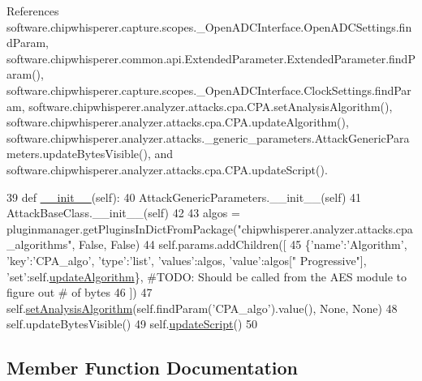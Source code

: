 References software.\+chipwhisperer.\+capture.\+scopes.\+\_\+\+Open\+A\+D\+C\+Interface.\+Open\+A\+D\+C\+Settings.\+find\+Param, software.\+chipwhisperer.\+common.\+api.\+Extended\+Parameter.\+Extended\+Parameter.\+find\+Param(), software.\+chipwhisperer.\+capture.\+scopes.\+\_\+\+Open\+A\+D\+C\+Interface.\+Clock\+Settings.\+find\+Param, software.\+chipwhisperer.\+analyzer.\+attacks.\+cpa.\+C\+P\+A.\+set\+Analysis\+Algorithm(), software.\+chipwhisperer.\+analyzer.\+attacks.\+cpa.\+C\+P\+A.\+update\+Algorithm(), software.\+chipwhisperer.\+analyzer.\+attacks.\+\_\+generic\+\_\+parameters.\+Attack\+Generic\+Parameters.\+update\+Bytes\+Visible(), and software.\+chipwhisperer.\+analyzer.\+attacks.\+cpa.\+C\+P\+A.\+update\+Script().


\begin{DoxyCode}
39     \textcolor{keyword}{def }\hyperlink{classsoftware_1_1chipwhisperer_1_1analyzer_1_1attacks_1_1cpa_1_1CPA_ae83c4d5f16963fe1c3aedde9085e972e}{\_\_init\_\_}(self):
40         AttackGenericParameters.\_\_init\_\_(self)
41         AttackBaseClass.\_\_init\_\_(self)
42 
43         algos = pluginmanager.getPluginsInDictFromPackage(\textcolor{stringliteral}{"chipwhisperer.analyzer.attacks.cpa\_algorithms"}, \textcolor{keyword}{
      False}, \textcolor{keyword}{False})
44         self.params.addChildren([
45             \{\textcolor{stringliteral}{'name'}:\textcolor{stringliteral}{'Algorithm'}, \textcolor{stringliteral}{'key'}:\textcolor{stringliteral}{'CPA\_algo'}, \textcolor{stringliteral}{'type'}:\textcolor{stringliteral}{'list'}, \textcolor{stringliteral}{'values'}:algos, \textcolor{stringliteral}{'value'}:algos[\textcolor{stringliteral}{"
      Progressive"}], \textcolor{stringliteral}{'set'}:self.\hyperlink{classsoftware_1_1chipwhisperer_1_1analyzer_1_1attacks_1_1cpa_1_1CPA_a16178f7a5d24e45eb6e05bdb9255fb25}{updateAlgorithm}\},            \textcolor{comment}{#TODO: Should be called from the AES module to
       figure out # of bytes}
46         ])
47         self.\hyperlink{classsoftware_1_1chipwhisperer_1_1analyzer_1_1attacks_1_1cpa_1_1CPA_a3f35e71a6b226c8c5b4ba08457df7a61}{setAnalysisAlgorithm}(self.findParam(\textcolor{stringliteral}{'CPA\_algo'}).value(), \textcolor{keywordtype}{None}, \textcolor{keywordtype}{None})
48         self.updateBytesVisible()
49         self.\hyperlink{classsoftware_1_1chipwhisperer_1_1analyzer_1_1attacks_1_1cpa_1_1CPA_aa77f970b093325f2f378888a28c3ae34}{updateScript}()
50 
\end{DoxyCode}


\subsection{Member Function Documentation}
\hypertarget{classsoftware_1_1chipwhisperer_1_1analyzer_1_1attacks_1_1cpa_1_1CPA_ae7db6d51ca83870782dcbc24fbc0e838}{}
